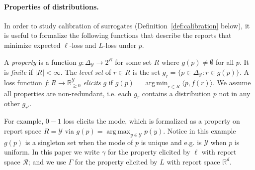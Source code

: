 \documentclass[anon]{colt2020} %
\newcommand{\reals}{\mathbb{R}}
\newcommand{\nonnegreals}{\reals_{\geq 0}}%
\newcommand{\simplex}{\Delta_\Y}
\newcommand{\R}{\mathcal{R}}
\newcommand{\Y}{\mathcal{Y}}
\newcommand{\inprod}[2]{\langle #1, #2 \rangle}%
\DeclareMathOperator*{\argmax}{arg\,max}
\DeclareMathOperator*{\argmin}{arg\,min}
\begin{document}
\paragraph{Properties of distributions.}
In order to study calibration of surrogates (Definition~\ref{def:calibration} below), it is useful to formalize the following functions that describe the reports that minimize expected $\ell$-loss and $L$-loss under $p$.
\begin{definition}
  A \emph{property} is a function $g: \simplex \to 2^{R}$ for some set $R$ where $g(p) \neq \emptyset$ for all $p$.
  It is \emph{finite} if $|R| < \infty$.
  The \emph{level set} of $r \in R$ is the set $g_r = \{p \in \simplex : r \in g(p)\}$.
  A loss function $f: R \to \nonnegreals^{\Y}$ \emph{elicits} $g$ if $g(p) = \argmin_{r \in R} \inprod{p}{f(r)}$.
  We assume all properties are non-redundant, i.e. each $g_r$ contains a distribution $p$ not in any other $g_{r'}$.
\end{definition}
For example, $0-1$ loss elicits the mode, which is formalized as a property on report space $R = \Y$ via $g(p) = \argmax_{y \in \Y} p(y)$.
Notice in this example $g(p)$ is a singleton set when the mode of $p$ is unique and e.g. is $\Y$ when $p$ is uniform.
In this paper we write $\gamma$ for the property elicited by $\ell$ with report space $\R$; and we use $\Gamma$ for the property elicited by $L$ with report space $\reals^d$.
\end{document}
